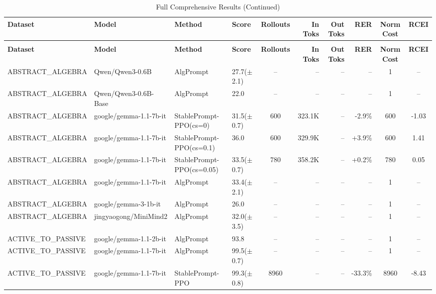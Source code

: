 {\scriptsize
\setlength{\tabcolsep}{6pt}
\begin{longtable}{@{}p{5.5cm}p{4.5cm}p{2.5cm}lcrrrcc@{}}
\caption{Full Comprehensive Results across all datasets and methods.}
\label{tab:full_comprehensive} \\
\toprule
\textbf{Dataset} & \textbf{Model} & \textbf{Method} & \textbf{Score} & \textbf{Rollouts} & \textbf{In Toks} & \textbf{Out Toks} & \textbf{RER} & \textbf{Norm Cost} & \textbf{RCEI} \\ \midrule
\endfirsthead
\caption[]{Full Comprehensive Results (Continued)} \\
\toprule
\textbf{Dataset} & \textbf{Model} & \textbf{Method} & \textbf{Score} & \textbf{Rollouts} & \textbf{In Toks} & \textbf{Out Toks} & \textbf{RER} & \textbf{Norm Cost} & \textbf{RCEI} \\ \midrule
\endhead
\bottomrule
\endfoot
\endlastfoot
ABSTRACT\_ALGEBRA & Qwen/Qwen3-0.6B & AlgPrompt & 27.7($\pm$2.1) & -- & -- & -- & -- & 1 & -- \\
\midrule
ABSTRACT\_ALGEBRA & Qwen/Qwen3-0.6B-Base & AlgPrompt & 22.0 & -- & -- & -- & -- & 1 & -- \\
\midrule
ABSTRACT\_ALGEBRA & google/gemma-1.1-7b-it & StablePrompt-PPO(cs=0) & 31.5($\pm$0.7) & 600 & 323.1K & -- & -2.9\% & 600 & -1.03 \\
ABSTRACT\_ALGEBRA & google/gemma-1.1-7b-it & StablePrompt-PPO(cs=0.1) & 36.0 & 600 & 329.9K & -- & +3.9\% & 600 & 1.41 \\
ABSTRACT\_ALGEBRA & google/gemma-1.1-7b-it & StablePrompt-PPO(cs=0.05) & 33.5($\pm$0.7) & 780 & 358.2K & -- & +0.2\% & 780 & 0.05 \\
ABSTRACT\_ALGEBRA & google/gemma-1.1-7b-it & AlgPrompt & 33.4($\pm$2.1) & -- & -- & -- & -- & 1 & -- \\
\midrule
ABSTRACT\_ALGEBRA & google/gemma-3-1b-it & AlgPrompt & 26.0 & -- & -- & -- & -- & 1 & -- \\
\midrule
ABSTRACT\_ALGEBRA & jingyaogong/MiniMind2 & AlgPrompt & 32.0($\pm$3.5) & -- & -- & -- & -- & 1 & -- \\
\midrule
ACTIVE\_TO\_PASSIVE & google/gemma-1.1-2b-it & AlgPrompt & 93.8 & -- & -- & -- & -- & 1 & -- \\
\midrule
ACTIVE\_TO\_PASSIVE & google/gemma-1.1-7b-it & AlgPrompt & 99.5($\pm$0.7) & -- & -- & -- & -- & 1 & -- \\
ACTIVE\_TO\_PASSIVE & google/gemma-1.1-7b-it & StablePrompt-PPO & 99.3($\pm$0.8) & 8960 & -- & -- & -33.3\% & 8960 & -8.43 \\

\end{longtable}}
